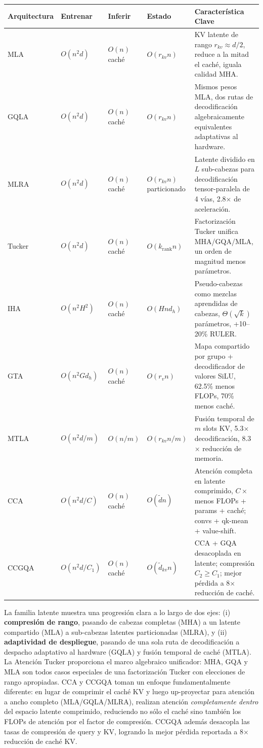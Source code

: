 \small
\begin{longtable}{p{2.0cm}p{1.8cm}p{1.6cm}p{1.6cm}p{4.5cm}}
\toprule
\textbf{Arquitectura} & \textbf{Entrenar} & \textbf{Inferir} & \textbf{Estado} & \textbf{Característica Clave} \\
\midrule
\endhead
MLA & $O(n^2 d)$ & $O(n)$ caché & $O(r_{kv} n)$ & KV latente de rango $r_{kv}\!\approx\!d/2$, reduce a la mitad el caché, iguala calidad MHA. \\
GQLA & $O(n^2 d)$ & $O(n)$ caché & $O(r_{kv} n)$ & Mismos pesos MLA, dos rutas de decodificación algebraicamente equivalentes adaptativas al hardware. \\
MLRA & $O(n^2 d)$ & $O(n)$ caché & $O(r_{kv} n)$ particionado & Latente dividido en $L$ sub-cabezas para decodificación tensor-paralela de 4 vías, 2.8$\times$ de aceleración. \\
Tucker & $O(n^2 d)$ & $O(n)$ caché & $O(k_{\text{rank}} n)$ & Factorización Tucker unifica MHA/GQA/MLA, un orden de magnitud menos parámetros. \\
IHA & $O(n^2 H^2)$ & $O(n)$ caché & $O(H n d_h)$ & Pseudo-cabezas como mezclas aprendidas de cabezas, $\Theta(\sqrt{k})$ parámetros, +10--20\% RULER. \\
GTA & $O(n^2 G d_h)$ & $O(n)$ caché & $O(r_v n)$ & Mapa compartido por grupo + decodificador de valores SiLU, 62.5\% menos FLOPs, 70\% menos caché. \\
MTLA & $O(n^2 d / m)$ & $O(n/m)$ & $O(r_{kv} n/m)$ & Fusión temporal de $m$ slots KV, 5.3$\times$ decodificación, 8.3$\times$ reducción de memoria. \\
CCA & $O(n^2 d / C)$ & $O(n)$ caché & $O(\tilde{d} n)$ & Atención completa en latente comprimido, $C{\times}$ menos FLOPs + params + caché; convs + qk-mean + value-shift. \\
CCGQA & $O(n^2 d / C_1)$ & $O(n)$ caché & $O(\tilde{d}_{kv} n)$ & CCA + GQA desacoplada en latente; compresión $C_2 \geq C_1$; mejor pérdida a 8$\times$ reducción de caché. \\
\bottomrule
\end{longtable}
\normalsize

La familia latente muestra una progresión clara a lo largo de dos ejes: (i) \textbf{compresión de rango}, pasando de cabezas completas (MHA) a un latente compartido (MLA) a sub-cabezas latentes particionadas (MLRA), y (ii) \textbf{adaptividad de despliegue}, pasando de una sola ruta de decodificación a despacho adaptativo al hardware (GQLA) y fusión temporal de caché (MTLA). La Atención Tucker proporciona el marco algebraico unificador: MHA, GQA y MLA son todos casos especiales de una factorización Tucker con elecciones de rango apropiadas. CCA y CCGQA toman un enfoque fundamentalmente diferente: en lugar de comprimir el caché KV y luego up-proyectar para atención a ancho completo (MLA/GQLA/MLRA), realizan atención \emph{completamente dentro} del espacio latente comprimido, reduciendo no sólo el caché sino también los FLOPs de atención por el factor de compresión. CCGQA además desacopla las tasas de compresión de query y KV, logrando la mejor pérdida reportada a 8$\times$ reducción de caché KV.
